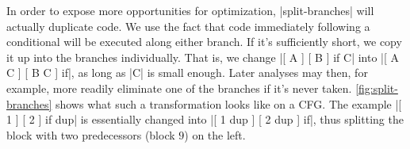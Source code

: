 
In order to expose more opportunities for optimization, \factor|split-branches|
will actually duplicate code.  We use the fact that code immediately following
a conditional will be executed along either branch.  If it's sufficiently
short, we copy it up into the branches individually.  That is, we change
%
\factor|[ A ] [ B ] if C|
%
into
%
\factor|[ A C ] [ B C ] if|,
%
as long as \factor|C| is small enough.  Later analyses may then, for example,
more readily eliminate one of the branches if it's never taken.
\vref{fig:split-branches} shows what such a transformation looks like on a
\gls{CFG}.  The example
%
\factor|[ 1 ] [ 2 ] if dup|
%
is essentially changed into
%
\factor|[ 1 dup ] [ 2 dup ] if|,
%
thus splitting the block with two predecessors (block $9$) on the left.





